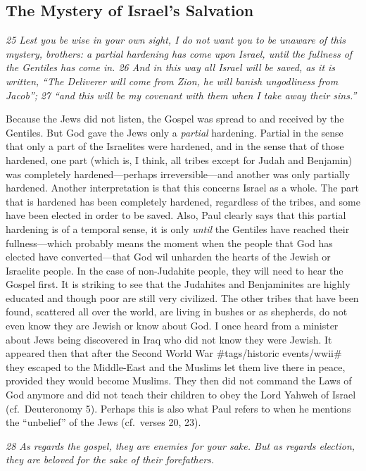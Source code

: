 \subsection{The Mystery of Israel's Salvation} \emph{25 Lest you be wise in
your own sight, I do not want you to be unaware of this mystery,
brothers: a partial hardening has come upon Israel, until the fullness
of the Gentiles has come in. 26 And in this way all Israel will be
saved, as it is written,} \emph{``The Deliverer will come from
Zion, he will banish ungodliness from Jacob'';} \emph{27 ``and
this will be my covenant with them when I take away their
sins.''}

Because the Jews did not listen, the Gospel was spread to and received
by the Gentiles. But God gave the Jews only a \emph{partial} hardening.
Partial in the sense that only a part of the Israelites were hardened,
and in the sense that of those hardened, one part (which is, I think,
all tribes except for Judah and Benjamin) was completely
hardened---perhaps irreversible---and another was only partially
hardened. Another interpretation is that this concerns Israel as a
whole. The part that is hardened has been completely hardened,
regardless of the tribes, and some have been elected in order to be
saved. Also, Paul clearly says that this partial hardening is of a
temporal sense, it is only \emph{until} the Gentiles have reached their
fullness---which probably means the moment when the people that God has
elected have converted---that God wil unharden the hearts of the Jewish
or Israelite people. In the case of non-Judahite people, they will need
to hear the Gospel first. It is striking to see that the Judahites and
Benjaminites are highly educated and though poor are still very
civilized. The other tribes that have been found, scattered all over the
world, are living in bushes or as shepherds, do not even know they are
Jewish or know about God. I once heard from a minister about Jews being
discovered in Iraq who did not know they were Jewish. It appeared then
that after the Second World War \#tags/historic events/wwii\# they
escaped to the Middle-East and the Muslims let them live there in peace,
provided they would become Muslims. They then did not command the Laws
of God anymore and did not teach their children to obey the Lord Yahweh
of Israel (cf.~Deuteronomy 5). Perhaps this is also what Paul refers to
when he mentions the ``unbelief'' of the Jews (cf.~verses 20, 23).

\emph{28 As regards the gospel, they are enemies for your sake. But as
regards election, they are beloved for the sake of their forefathers.}

